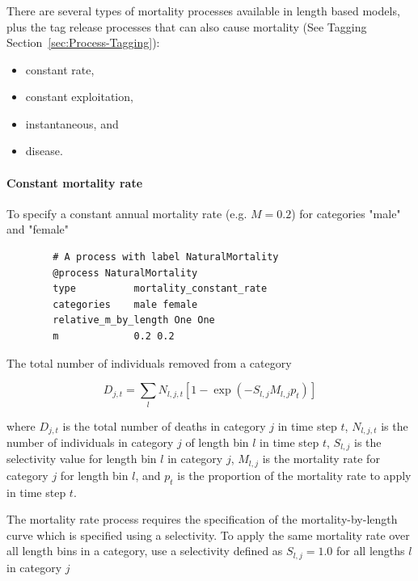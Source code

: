 \subsubsection{\label{sec:Process-Mortality}}

There are several types of mortality processes available in \CNAME length based models, plus the tag release processes that can also cause mortality (See Tagging Section~\ref{sec:Process-Tagging}):

\begin{itemize}
	\item constant rate,
	\item constant exploitation,
	\item instantaneous, and
	\item disease.
\end{itemize}

\paragraph{Constant mortality rate}\label{sec:Process-MortalityConstantRate} 

To specify a constant annual mortality rate (e.g. $M=0.2$) for categories "male" and "female"
{\small{\begin{verbatim}
		# A process with label NaturalMortality
		@process NaturalMortality
		type          mortality_constant_rate
		categories    male female
		relative_m_by_length One One
		m             0.2 0.2
		\end{verbatim}}}

The total number of individuals removed from a category

\begin{equation}
D_{j,t} = \sum_l N_{l,j,t} [1 - \exp(-S_{l,j} M_{l,j} p_t)]
\end{equation}

where $D_{j,t}$ is the total number of deaths in category $j$ in time step $t$, $N_{l,j,t}$ is the number of individuals in category $j$ of length bin $l$ in time step $t$, $S_{l,j}$ is the selectivity value for length bin $l$ in category $j$, $M_{l,j}$ is the mortality rate for category $j$ for length bin $l$, and $p_t$ is the proportion of the mortality rate to apply in time step $t$.

The mortality rate process requires the specification of the mortality-by-length curve which is specified using a selectivity. To apply the same mortality rate over all length bins in a category, use a selectivity defined as $S_{l,j}=1.0$ for all lengths $l$ in category $j$

